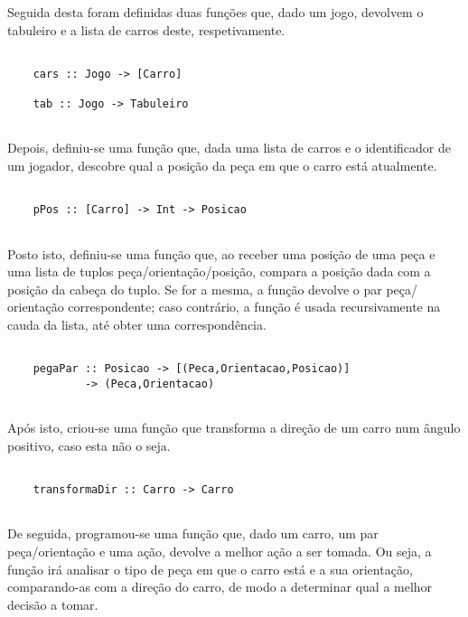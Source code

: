 \documentclass[a4paper]{report} %
\begin{document}
  \newpage
  
  \par \noindent Seguida desta foram definidas duas funções que, dado um jogo, devolvem o tabuleiro e a lista de carros deste, respetivamente.
  
  \begin{verbatim}
      
    cars :: Jogo -> [Carro]

    tab :: Jogo -> Tabuleiro
      
  \end{verbatim}
  
  \par \noindent Depois, definiu-se uma função que, dada uma lista de carros e o identificador de um jogador, descobre qual a posição da peça em que o carro está atualmente.
  
  \begin{verbatim}
      
    pPos :: [Carro] -> Int -> Posicao  
      
  \end{verbatim}
  
  \par \noindent Posto isto, definiu-se uma função que, ao receber uma posição de uma peça e uma lista de tuplos peça/orientação/posição, compara a posição dada com a posição da cabeça do tuplo. Se for a mesma, a função devolve o par peça/ orientação correspondente; caso contrário, a função é usada recursivamente na cauda da lista, até obter uma correspondência. 
  
  \begin{verbatim}
      
    pegaPar :: Posicao -> [(Peca,Orientacao,Posicao)]
            -> (Peca,Orientacao)  
      
  \end{verbatim}
  
  \par  \noindent Após isto, criou-se uma função que transforma a direção de um carro num ângulo positivo, caso esta não o seja.
  
  \begin{verbatim}
      
    transformaDir :: Carro -> Carro  
      
  \end{verbatim}
  
  \par \noindent De seguida, programou-se uma função que, dado um carro, um par peça/orientação e uma ação, devolve a melhor ação a ser tomada. Ou seja, a função irá analisar o tipo de peça em que o carro está e a sua orientação, comparando-as com a direção do carro, de modo a determinar qual a melhor decisão a tomar.
  
\end{document}
